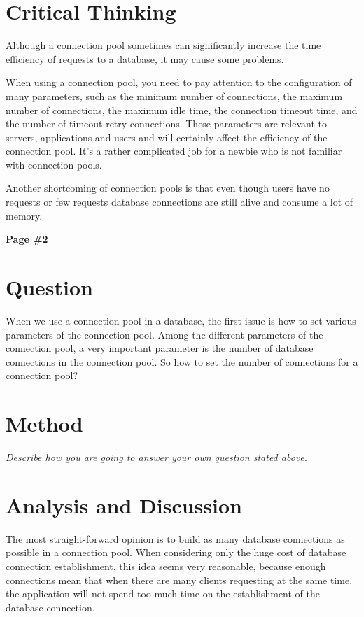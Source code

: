 \documentclass[12pt, a4paper]{article}
\begin{document}
\section{Critical Thinking}

Although a connection pool sometimes can significantly increase the time efficiency of requests to a database, it may cause some problems.

When using a connection pool, you need to pay attention to the configuration of many parameters, such as the minimum number of connections, the maximum number of connections, the maximum idle time, the connection timeout time, and the number of timeout retry connections. These parameters are relevant to servers, applications and users and will certainly affect the efficiency of the connection pool. It's a rather complicated job for a newbie who is not familiar with connection pools.

Another shortcoming of connection pools is that even though users have no requests or few requests database connections are still alive and consume a lot of memory.

\newpage

\begin{center}
{\textbf{
Page \#2}}
\end{center}

\section{Question}

When we use a connection pool in a database, the first issue is how to set various parameters of the connection pool. Among the different parameters of the connection pool, a very important parameter is the number of database connections in the connection pool. So how to set the number of connections for a connection pool?

\section{Method}

{\emph{Describe how you are going to answer your own question stated above.}}

\section{Analysis and Discussion}

The most straight-forward opinion is to build as many database connections as possible in a connection pool. When considering only the huge cost of database connection establishment, this idea seems very reasonable, because enough connections mean that when there are many clients requesting at the same time, the application will not spend too much time on the establishment of the database connection.
\end{document}
